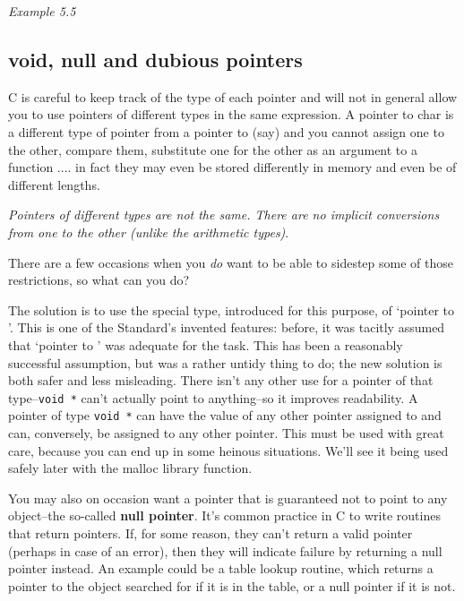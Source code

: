     \begin{center}\textit{Example 5.5}\end{center}


  

  \subsection{void, null and dubious pointers}
   

   C is careful to keep track of the type of each pointer and will not in
    general allow you to use pointers of different types in the same
    expression. A pointer to char is a different type of pointer from
    a pointer to \kint{} (say) and you cannot assign one to the
    other, compare them, substitute one for the other as an argument to
    a function .... in fact they may even be stored differently in memory
    and even be of different lengths.


   \textit{Pointers of different types are not the same. There are no
    implicit conversions from one to the other (unlike the arithmetic
    types)}.


   There are a few occasions when you \textit{do} want to be able to
    sidestep some of those restrictions, so what can you do?


   The solution is to use the special type, introduced for this purpose,
    of `pointer to \void{}'. This is one of the Standard's
    invented features: before, it was tacitly assumed that `pointer to
    \kchar' was adequate for the task. This has been
    a reasonably successful assumption, but was a rather untidy thing to do;
    the new solution is both safer and less misleading. There isn't any
    other use for a pointer of that type--\texttt{void *} can't
    actually point to anything--so it improves readability. A pointer of
    type \texttt{void *} can have the value of any other pointer
    assigned to and can, conversely, be assigned to any other pointer. This
    must be used with great care, because you can end up in some heinous
    situations. We'll see it being used safely later with the malloc library
    function.


   You may also on occasion want a pointer that is guaranteed not to
    point to any object--the so-called \textbf{null pointer}. It's
    common practice in C to write routines that return pointers. If, for
    some reason, they can't return a valid pointer (perhaps in case of an
    error), then they will indicate failure by returning a null pointer
    instead. An example could be a table lookup routine, which returns
    a pointer to the object searched for if it is in the table, or a null
    pointer if it is not.


